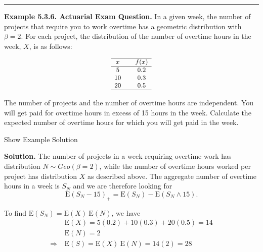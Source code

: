 \documentclass[]{book}
\theoremstyle{definition}
\theoremstyle{definition}
\theoremstyle{definition}
\theoremstyle{remark}
\begin{document}
\begin{center}\rule{0.5\linewidth}{\linethickness}\end{center}

\textbf{Example 5.3.6. Actuarial Exam Question.} In a given week, the
number of projects that require you to work overtime has a geometric
distribution with \(\beta=2\). For each project, the distribution of the
number of overtime hours in the week, \(X\), is as follows:

\[
{\small 
\begin{matrix}
\begin{array}{ccc} \hline
    x &  & f(x)\\ \hline
    5 &  & 0.2 \\
    10 & & 0.3 \\
    20 & & 0.5\\ \hline
  \end{array}
\end{matrix}
}
\]

The number of projects and the number of overtime hours are independent.
You will get paid for overtime hours in excess of 15 hours in the week.
Calculate the expected number of overtime hours for which you will get
paid in the week.

Show Example Solution

\hypertarget{toggleExampleAggLoss.3.6}{}
\textbf{Solution.} The number of projects in a week requiring overtime
work has distribution \(N \sim Geo(\beta=2)\), while the number of
overtime hours worked per project has distribution \(X\) as described
above. The aggregate number of overtime hours in a week is \(S_N\) and
we are therefore looking for
\[\mathrm{E}(S_N-15)_+ = \mathrm{E}(S_N) - \mathrm{E}(S_N \wedge 15).\]

To find \(\mathrm{E}(S_N) = \mathrm{E}(X) ~\mathrm{E}(N)\), we have
\[\begin{aligned}
&\mathrm{E}(X) = 5(0.2) + 10(0.3)+ 20(0.5)= 14 \\
&\mathrm{E}(N) = 2 \\
\Rightarrow \ &\mathrm{E}(S) = \mathrm{E}(X) ~ \mathrm{E}(N) = 14(2) = 28
\end{aligned}\]
\end{document}
